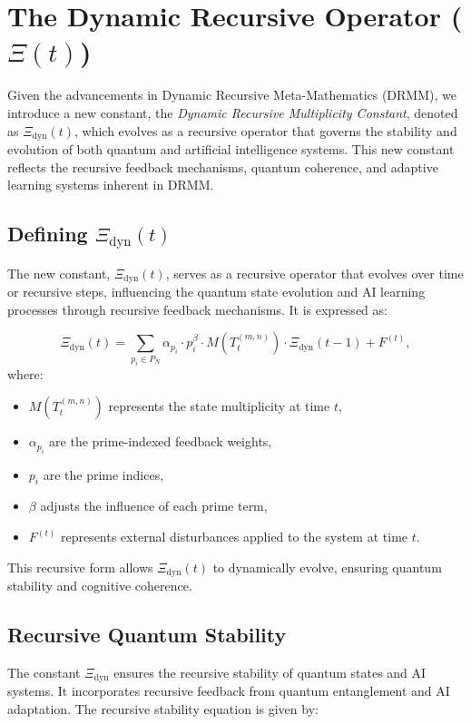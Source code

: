\documentclass[12pt]{article}
\begin{document}
\section{The Dynamic Recursive Operator (\(\Xi(t)\))}
Given the advancements in Dynamic Recursive Meta-Mathematics (DRMM), we introduce a new constant, the \textit{Dynamic Recursive Multiplicity Constant}, denoted as $\Xi_{\text{dyn}}(t)$, which evolves as a recursive operator that governs the stability and evolution of both quantum and artificial intelligence systems. This new constant reflects the recursive feedback mechanisms, quantum coherence, and adaptive learning systems inherent in DRMM.

\subsection{Defining $\Xi_{\text{dyn}}(t)$}
The new constant, $\Xi_{\text{dyn}}(t)$, serves as a recursive operator that evolves over time or recursive steps, influencing the quantum state evolution and AI learning processes through recursive feedback mechanisms. It is expressed as:

\[
\Xi_{\text{dyn}}(t) = \sum_{p_i \in P_N} \alpha_{p_i} \cdot p_i^{\beta} \cdot M(T_t^{(m, n)}) \cdot \Xi_{\text{dyn}}(t-1) + F^{(t)},
\]
where:
\begin{itemize}
    \item $M(T_t^{(m, n)})$ represents the state multiplicity at time $t$,
    \item $\alpha_{p_i}$ are the prime-indexed feedback weights,
    \item $p_i$ are the prime indices,
    \item $\beta$ adjusts the influence of each prime term,
    \item $F^{(t)}$ represents external disturbances applied to the system at time $t$.
\end{itemize}

This recursive form allows $\Xi_{\text{dyn}}(t)$ to dynamically evolve, ensuring quantum stability and cognitive coherence.

\subsection{Recursive Quantum Stability}
The constant $\Xi_{\text{dyn}}$ ensures the recursive stability of quantum states and AI systems. It incorporates recursive feedback from quantum entanglement and AI adaptation. The recursive stability equation is given by:
\end{document}

